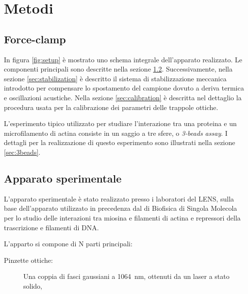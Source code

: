 \chapter{Metodi}
\label{cap:methods}

\section{Force-clamp}


In figura \ref{fig:setup} è mostrato uno schema integrale
dell'apparato realizzato.
Le componenti principali sono descritte nella sezione \ref{sec:setup}.
Successivamente, nella sezione \ref{sec:stabilization} è descritto il
sistema di stabilizzazione meccanica introdotto per compensare lo
spostamento
del campione dovuto a deriva termica e oscillazioni acustiche.
Nella sezione \ref{sec:calibration} è descritta nel dettaglio la
procedura usata per la calibrazione dei parametri delle trappole
ottiche.

L'esperimento tipico utilizzato per studiare l'interazione tra una
proteina e un microfilamento di actina consiste in un saggio a tre
sfere, o \textit{3-beads assay}. I dettagli per la realizzazione di
questo esperimento sono illustrati nella sezione \ref{sec:3beads}.

\section{Apparato sperimentale}
\label{sec:setup}

L'apparato sperimentale è stato realizzato presso i laboratori del
LENS, sulla base dell'apparato utilizzato in precedenza dal di
Biofisica di Singola Molecola per lo studio delle interazioni tra
miosina e filamenti di actina e repressori della trascrizione
e filamenti di DNA.

L'apparto si compone di N parti principali:
\begin{description}
    \item[Pinzette ottiche:] Una coppia di fasci gaussiani a \SI{1064}{\nm}, ottenuti da un laser a stato solido, 
\end{description}



